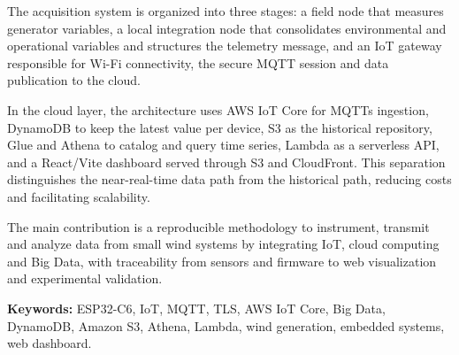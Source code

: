 The acquisition system is organized into three stages: a field node that measures generator variables, a local integration node that consolidates environmental and operational variables and structures the telemetry message, and an IoT gateway responsible for Wi-Fi connectivity, the secure MQTT session and data publication to the cloud.

In the cloud layer, the architecture uses AWS IoT Core for MQTTs ingestion, DynamoDB to keep the latest value per device, S3 as the historical repository, Glue and Athena to catalog and query time series, Lambda as a serverless API, and a React/Vite dashboard served through S3 and CloudFront. This separation distinguishes the near-real-time data path from the historical path, reducing costs and facilitating scalability.

The main contribution is a reproducible methodology to instrument, transmit and analyze data from small wind systems by integrating IoT, cloud computing and Big Data, with traceability from sensors and firmware to web visualization and experimental validation.

\vspace{0.5cm}

\noindent
\textbf{Keywords:} ESP32-C6, IoT, MQTT, TLS, AWS IoT Core, Big Data, DynamoDB, Amazon S3, Athena, Lambda, wind generation, embedded systems, web dashboard.


\cleardoublepage
\tableofcontents

\cleardoublepage
\listoftables

\cleardoublepage
\listoffigures

\cleardoublepage
\mainmatter